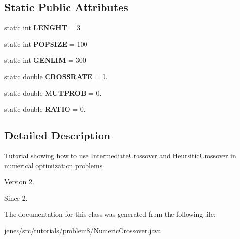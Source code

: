 \subsection*{Static Public Attributes}
\begin{DoxyCompactItemize}
\item 
\hypertarget{classjenes_1_1tutorials_1_1problem8_1_1_numeric_crossover_af73d636c488b92bf3ae33d19d1f5f5e7}{static int {\bfseries L\-E\-N\-G\-H\-T} = 3}\label{classjenes_1_1tutorials_1_1problem8_1_1_numeric_crossover_af73d636c488b92bf3ae33d19d1f5f5e7}

\item 
\hypertarget{classjenes_1_1tutorials_1_1problem8_1_1_numeric_crossover_a0a9b3b839ab6677dcbae723434df6551}{static int {\bfseries P\-O\-P\-S\-I\-Z\-E} = 100}\label{classjenes_1_1tutorials_1_1problem8_1_1_numeric_crossover_a0a9b3b839ab6677dcbae723434df6551}

\item 
\hypertarget{classjenes_1_1tutorials_1_1problem8_1_1_numeric_crossover_a5e45487dcf5730d7c628ca85b21160dc}{static int {\bfseries G\-E\-N\-L\-I\-M} = 300}\label{classjenes_1_1tutorials_1_1problem8_1_1_numeric_crossover_a5e45487dcf5730d7c628ca85b21160dc}

\item 
\hypertarget{classjenes_1_1tutorials_1_1problem8_1_1_numeric_crossover_ae4fcf3a595e386c6aeec443dedaba83f}{static double {\bfseries C\-R\-O\-S\-S\-R\-A\-T\-E} = 0.}\label{classjenes_1_1tutorials_1_1problem8_1_1_numeric_crossover_ae4fcf3a595e386c6aeec443dedaba83f}

\item 
\hypertarget{classjenes_1_1tutorials_1_1problem8_1_1_numeric_crossover_a4d0587e4b39b1f74efd20a0c921c38f7}{static double {\bfseries M\-U\-T\-P\-R\-O\-B} = 0.}\label{classjenes_1_1tutorials_1_1problem8_1_1_numeric_crossover_a4d0587e4b39b1f74efd20a0c921c38f7}

\item 
\hypertarget{classjenes_1_1tutorials_1_1problem8_1_1_numeric_crossover_ae3c1d4871321a6323d09add505679fe0}{static double {\bfseries R\-A\-T\-I\-O} = 0.}\label{classjenes_1_1tutorials_1_1problem8_1_1_numeric_crossover_ae3c1d4871321a6323d09add505679fe0}

\end{DoxyCompactItemize}


\subsection{Detailed Description}
Tutorial showing how to use Intermediate\-Crossover and Heursitic\-Crossover in numerical optimization problems.

\begin{DoxyVersion}{Version}
2. 
\end{DoxyVersion}
\begin{DoxySince}{Since}
2. 
\end{DoxySince}


The documentation for this class was generated from the following file\-:\begin{DoxyCompactItemize}
\item 
jenes/src/tutorials/problem8/Numeric\-Crossover.\-java\end{DoxyCompactItemize}
